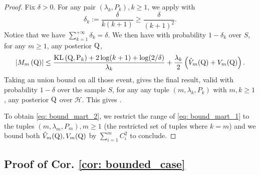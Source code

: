\begin{proof}
Fix $\delta>0$. For any pair $(\lambda_k,P_k), k\geq 1$, we apply  with $$\delta_k := \frac{\delta}{k(k+1)} \geq \frac{\delta}{(k+1)^2}. $$
Notice that we have $\sum_{k=1}^{+\infty} \delta_k = \delta$.
We then have with probability $1-\delta_k$ over $S$, for any $m\geq 1$, any posterior $\mathrm{Q}$,
\[ \left|M_m\left(\mathrm{Q}\right)\right| \leq \frac{\mathrm{KL}\left(\mathrm{Q}, \mathrm{P}_k\right)+2 \log (k+1)+\log (2/\delta)}{\lambda_k}+ \frac{\lambda_k}{2}\left( \hat{V}_m(\mathrm{Q}) + V_m(\mathrm{Q}) \right).\]
Taking an union bound on all those event, gives the final result, valid with probability $1-\delta$ over the sample $S$, for any any tuple $(m,\lambda_k,P_k)$ with $m,k\geq 1$, any posterior $\mathrm{Q}$ over $\mathcal{H}$. This gives .

To obtain \cref{eq: bound_mart_2}, we restrict the range of \cref{eq: bound_mart_1} to the tuples $(m,\lambda_m,P_m), m\geq 1$ (the restricted set of tuples where $k=m$) and we bound both $\hat{V}_m(\mathrm{Q}),V_m(\mathrm{Q})$ by $\sum_{i=1}^m C_i^2$ to conclude.
\end{proof}

\subsection{Proof of Cor. \ref{cor: bounded_case}}


